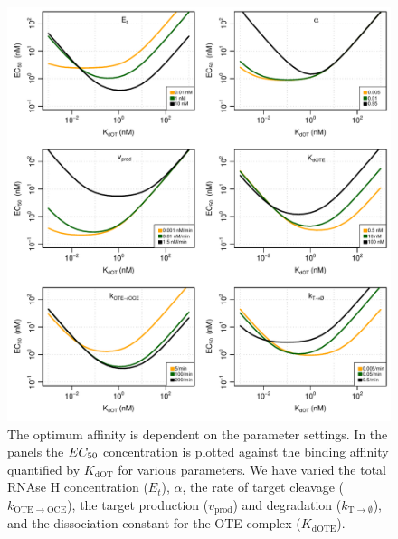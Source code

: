 \documentclass[a4paper,11pt]{article}
\newenvironment{Ncenter}{%
  \setlength\topsep{-10pt}
  \setlength\parskip{-100pt}
  \begin{center}
}{%
  \end{center}
}
\newcommand{\kE}{k_{\mathrm{OTE \to OCE}}}
\newcommand{\vp}{v_{\mathrm{prod}}}
\newcommand{\vd}{k_{\mathrm{T \to \emptyset}}}
\newcommand{\EC}{EC_{\rm{50}}}
\newcommand{\KdOT}{K_{\mathrm{dOT}}}
\newcommand{\KdOTE}{K_{\mathrm{dOTE}}}
\begin{document}
\begin{figure}[!h]
\begin{Ncenter}
\includegraphics[width=\textwidth]{SuppFile1-S2.pdf}
\end{Ncenter}
\caption{The optimum affinity is dependent on the parameter settings. In the panels the $\EC$ concentration is plotted against the binding affinity quantified by $\KdOT$ for various parameters. We have varied the total RNAse H concentration ($E_t$), $\alpha$, the rate of target cleavage ($\kE$), the target production ($\vp$) and degradation ($\vd$), and the dissociation constant for the OTE complex ($\KdOTE$).}\label{fig::Opt}
\end{figure}


\end{document}
